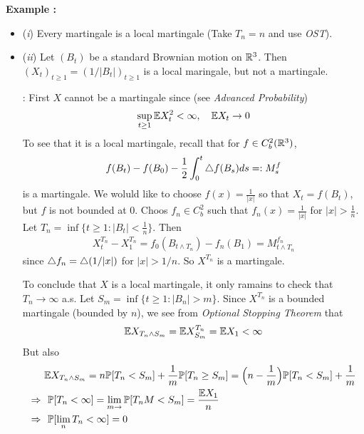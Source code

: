 \documentclass[12pt,a4paper]{article}
\newenvironment{subproof}
{\begin{changemargin}{0.5cm}{0.5cm} 
	}%
	{\end{changemargin}
}
\renewenvironment{i}
{\begin{itemize} 
	}%
	{\end{itemize}
}
\begin{document}
\textbf{Example :} 
\begin{i}
\item[(\textit{i})] Every martingale is a local martingale (Take $T_n = n$ and use \emph{OST}).
\item[(\textit{ii})] Let $(B_t)$ be a standard Brownian motion on $\mathbb{R}^3$. Then $(X_t)_{t\geq 1} = (1/|B_t|)_{t\geq 1}$ is a local maringale, but not a martingale.
\begin{subproof}
: First $X$ cannot be a martingale since (see \emph{Advanced Probability})
\begin{align*}
\sup_{t\geq 1} \mathbb{E} X_t^2 < \infty, \quad \mathbb{E} X_t \rightarrow 0
\end{align*}
To see that it is a local martingale, recall that for $f\in C_b^2(\mathbb{R}^3)$,
\begin{align*}
f(B_t) - f(B_0) - \frac{1}{2}\int_0^t \triangle f(B_s) ds =: M_s^f
\end{align*}
is a martingale. We woluld like to choose $f(x) = \frac{1}{|x|}$ so that $X_t = f(B_t)$, but $f$ is not bounded at 0. Choos $f_n \in C_b^2$ such that $f_n(x) =\frac{1}{|x|}$ for $|x|> \frac{1}{n}$. Let $T_n = \inf \{ t\geq 1: |B_t | < \frac{1}{n}\}$. Then
\begin{align*}
X_t^{T_n} - X_1^{T_n} = f_0(B_{t\wedge T_n}) - f_n(B_1) = M_{t\wedge T_n}^{f_n}
\end{align*}
since $\triangle f_n = \triangle (1/ |x|)$ for $|x| > 1/n$. So $X^{T_n}$ is a martingale.

\quad To conclude that $X$ is a local martingale, it only ramains to check that $T_n\rightarrow \infty$ a.s. Let $S_m = \inf \{ t\geq 1 : |B_n| >m\}$. Since $X^{T_n}$ is a bounded martingale (bounded by $n$), we see from \emph{Optional Stopping Theorem} that
\begin{align*}
\mathbb{E} X_{T_n \wedge S_m} = \mathbb{E} X_{S_m}^{T_n} = \mathbb{E} X_1 < \infty
\end{align*}
But also
\begin{align*}
& \mathbb{E} X_{T_n \wedge S_m} = n \mathbb{P} [T_n < S_m ] + \frac{1}{m} \mathbb{P}[T_n \geq S_m] = \Big(n - \frac{1}{m} \Big) \mathbb{P} [T_n <S_m] + \frac{1}{m} \\
\Rightarrow  \,\, &  \,\, \mathbb{P} [T_n < \infty] = \lim_{m\rightarrow } \mathbb{P} [T_n M < S_m] = \frac{\mathbb{E} X_1}{n} \\
\Rightarrow  \,\, &  \,\,  \mathbb{P} [\lim_n T_n < \infty] =0
\end{align*}
\end{subproof}
\end{i}
\s
\end{document}
